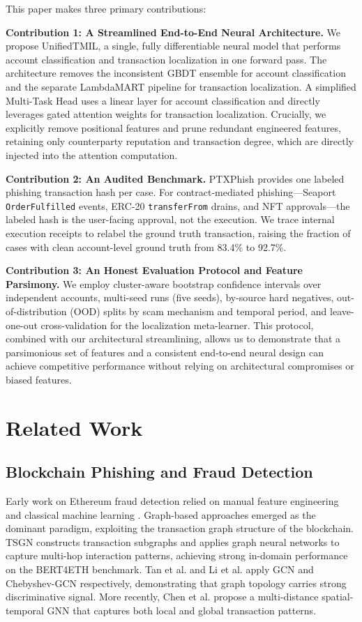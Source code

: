 \documentclass[conference]{IEEEtran}
\begin{document}
This paper makes three primary contributions:

\textbf{Contribution 1: A Streamlined End-to-End Neural Architecture.} We propose UnifiedTMIL, a single, fully differentiable neural model that performs account classification and transaction localization in one forward pass. The architecture removes the inconsistent GBDT ensemble for account classification and the separate LambdaMART pipeline for transaction localization. A simplified Multi-Task Head uses a linear layer for account classification and directly leverages gated attention weights for transaction localization. Crucially, we explicitly remove positional features and prune redundant engineered features, retaining only counterparty reputation and transaction degree, which are directly injected into the attention computation.

\textbf{Contribution 2: An Audited Benchmark.} PTXPhish \cite{ptxphish} provides one labeled phishing transaction hash per case. For contract-mediated phishing---Seaport \texttt{OrderFulfilled} events, ERC-20 \texttt{transferFrom} drains, and NFT approvals---the labeled hash is the user-facing approval, not the execution. We trace internal execution receipts to relabel the ground truth transaction, raising the fraction of cases with clean account-level ground truth from 83.4\% to 92.7\%.

\textbf{Contribution 3: An Honest Evaluation Protocol and Feature Parsimony.} We employ cluster-aware bootstrap confidence intervals over independent accounts, multi-seed runs (five seeds), by-source hard negatives, out-of-distribution (OOD) splits by scam mechanism and temporal period, and leave-one-out cross-validation for the localization meta-learner. This protocol, combined with our architectural streamlining, allows us to demonstrate that a parsimonious set of features and a consistent end-to-end neural design can achieve competitive performance without relying on architectural compromises or biased features.

\section{Related Work}

\subsection{Blockchain Phishing and Fraud Detection}
Early work on Ethereum fraud detection relied on manual feature engineering and classical machine learning \cite{chen_survey}. Graph-based approaches emerged as the dominant paradigm, exploiting the transaction graph structure of the blockchain. TSGN \cite{tsgn} constructs transaction subgraphs and applies graph neural networks to capture multi-hop interaction patterns, achieving strong in-domain performance on the BERT4ETH benchmark. Tan et al. \cite{tan_gcn} and Li et al. \cite{li_gcn} apply GCN and Chebyshev-GCN respectively, demonstrating that graph topology carries strong discriminative signal. More recently, Chen et al. \cite{chen_gcn} propose a multi-distance spatial-temporal GNN that captures both local and global transaction patterns.
\end{document}
